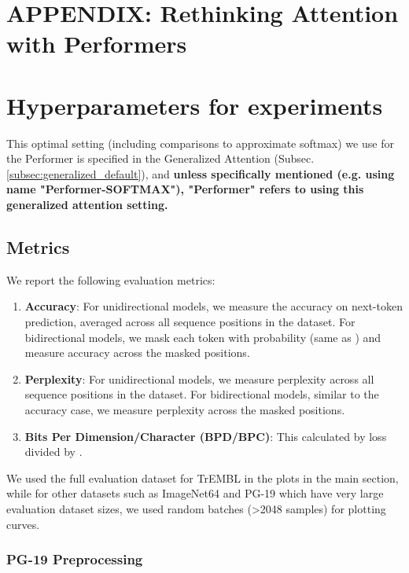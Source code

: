 \section*{APPENDIX: Rethinking Attention with Performers}
\setcounter{section}{0}
\renewcommand{\thesection}{\Alph{section}}
\label{sec:appendix}

\section{Hyperparameters for experiments}
\label{appendix:hyperparameters}
This optimal setting (including comparisons to approximate softmax) we use for the Performer is specified in the Generalized Attention (Subsec. \ref{subsec:generalized_default}), and \textbf{unless specifically mentioned (e.g. using name "Performer-SOFTMAX"), "Performer" refers to using this generalized attention setting.}

\subsection{Metrics}
We report the following evaluation metrics:
\vspace{-3mm}
\begin{enumerate}[itemsep=0.2mm]
\item \textbf{Accuracy}: For unidirectional models, we measure the accuracy on next-token prediction, averaged across all sequence positions in the dataset. For bidirectional models, we mask each token with  probability (same as \citep{bert}) and measure accuracy across the masked positions.
\item \textbf{Perplexity}: For unidirectional models, we measure perplexity across all sequence positions in the dataset. For bidirectional models, similar to the accuracy case, we measure perplexity across the masked positions.
\item \textbf{Bits Per Dimension/Character (BPD/BPC)}: This calculated by loss divided by .
\end{enumerate}
\vspace{-3mm}
We used the full evaluation dataset for TrEMBL in the plots in the main section, while for other datasets such as ImageNet64 and PG-19 which have very large evaluation dataset sizes, we used random batches (>2048 samples) for plotting curves. 

\subsubsection{PG-19 Preprocessing}

